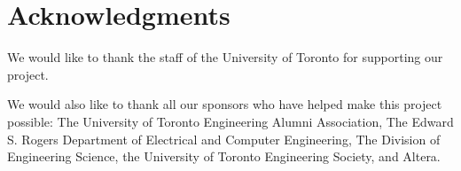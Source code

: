 \section{Acknowledgments}
\label{ack}
\vspace{-.03in}

We would like to thank the staff of the University of Toronto for
supporting our project.

We would also like to thank all our sponsors who have helped make this
project possible: The University of Toronto Engineering Alumni
Association, The Edward S. Rogers Department of Electrical and
Computer Engineering, The Division of Engineering Science, the
University of Toronto Engineering Society, and Altera.

